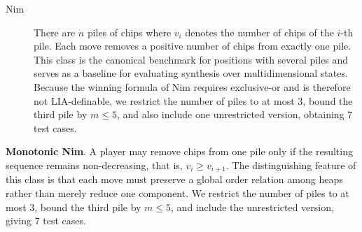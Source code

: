 \documentclass[review]{elsarticle}
\newcommand{\set}[1]{\{ #1 \}}
\newcommand{\tuple}[1]{\langle {#1} \rangle}
\newcommand{\true}{\top}
\newcommand{\statevar}{\mathcal{X}}
\newcommand{\act}{\mathcal{A}}
\newcommand{\constraint}{\mathcal{C}}
\newcommand{\estate}{\mathcal{E}}
\newcommand{\pre}{\mathtt{pre}}
\newcommand{\eff}{\mathtt{eff}}
\begin{document}
\begin{description}
	\item[Nim] There are $n$ piles of chips where $v_i$ denotes the number of chips of the $i$-th pile.
	Each move removes a positive number of chips from exactly one pile.
	This class is the canonical benchmark for positions with several piles and serves as a baseline for evaluating synthesis over multidimensional states.
	Because the winning formula of Nim requires exclusive-or and is therefore not LIA-definable, we restrict the number of piles to at most $3$, bound the third pile by $m \le 5$, and also include one unrestricted version, obtaining $7$ test cases.
\end{description}


\textbf{Monotonic Nim}. A player may remove chips from one pile only if the resulting sequence remains non-decreasing, that is, $v_i \ge v_{i+1}$.
The distinguishing feature of this class is that each move must preserve a global order relation among heaps rather than merely reduce one component.
We restrict the number of piles to at most $3$, bound the third pile by $m \le 5$, and include the unrestricted version, giving $7$ test cases.
\end{document}
